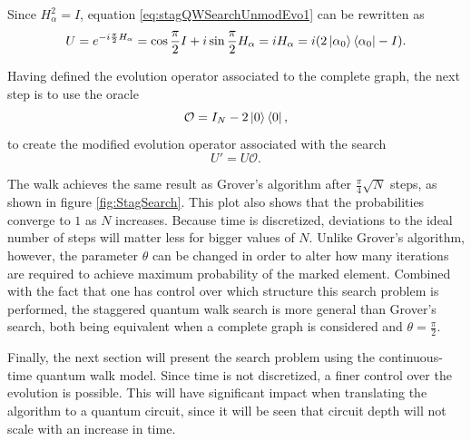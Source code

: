 \documentclass[../../dissertation.tex]{subfiles}
\begin{document}
Since $H_\alpha^2 = I$, equation \eqref{eq:stagQWSearchUnmodEvo1} can be
rewritten as
\begin{equation}
	U = e^{-i\frac{\pi}{2} H_\alpha} = \cos{\frac{\pi}{2}I} + i\sin{\frac{\pi}{2}H_\alpha} = i H_\alpha = i(2\ket{\alpha_0}\bra{\alpha_0} - I).
\end{equation}\par
Having defined the evolution operator associated to the complete graph,
the next step is to use the oracle
\begin{equation}
	\mathcal{O} = I_N - 2\ket{0}\bra{0},
\end{equation}
to create the modified evolution operator associated with the search
\begin{equation}
	U' = U\mathcal{O}.
	\label{eq:stagSearchSimulModEvoOp}
\end{equation}\par
The walk achieves the same result as Grover's algorithm after
$\frac{\pi}{4}\sqrt{N}$ steps, as shown in figure \ref{fig:StagSearch}. This
plot also shows that the probabilities converge to $1$ as $N$ increases.
Because time is discretized, deviations to the ideal number of steps will
matter less for bigger values of $N$.
Unlike Grover's algorithm, however, the parameter $\theta$ can be changed in
order to alter how many iterations are required to achieve maximum probability
of the marked element. Combined with the fact that one has control over which
structure this search problem is performed, the staggered quantum walk search is
more general than Grover's search, both being equivalent
when a complete graph is considered and $\theta = \frac{\pi}{2}$.\par
Finally, the next section will present the search problem using the
continuous-time quantum walk model. Since time is not discretized, a finer
control over the evolution is possible. This will have significant impact when
translating the algorithm to a quantum circuit, since it will be seen that
circuit depth will not scale with an increase in time. 
\end{document}
